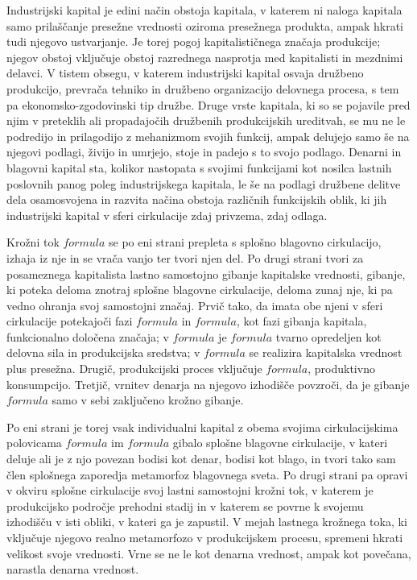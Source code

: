 \documentclass[kapital_02.tex]{subfiles}
\begin{document}
Industrijski kapital je edini način obstoja kapitala, v katerem ni naloga kapitala samo prilaščanje presežne vrednosti oziroma presežnega produkta, ampak hkrati tudi njegovo ustvarjanje. Je torej pogoj kapitalističnega značaja produkcije; njegov obstoj vključuje obstoj razrednega nasprotja med kapitalisti in mezdnimi delavci. V tistem obsegu, v katerem industrijski kapital osvaja družbeno produkcijo, prevrača tehniko in družbeno organizacijo delovnega procesa, s tem pa ekonomsko-zgodovinski tip družbe. Druge vrste kapitala, ki so se pojavile pred njim v preteklih ali propadajočih družbenih produkcijskih ureditvah, se mu ne le podredijo in prilagodijo z mehanizmom svojih funkcij, ampak delujejo samo še na njegovi podlagi, živijo in umrjejo, stoje in padejo s to svojo podlago. Denarni in blagovni kapital sta, kolikor nastopata s svojimi funkcijami kot nosilca lastnih poslovnih panog poleg industrijskega kapitala, le še na podlagi družbene delitve dela osamosvojena in razvita načina obstoja različnih funkcijskih oblik, ki jih industrijski kapital v sferi cirkulacije zdaj privzema, zdaj odlaga.

Krožni tok \( formula \) se po eni strani prepleta s splošno blagovno cirkulacijo, izhaja iz nje in se vrača vanjo ter tvori njen del. Po drugi strani tvori za posameznega kapitalista lastno samostojno gibanje kapitalske vrednosti, gibanje, ki poteka deloma znotraj splošne blagovne cirkulacije, deloma zunaj nje, ki pa vedno ohranja svoj samostojni značaj. Prvič tako, da imata obe njeni v sferi cirkulacije potekajoči fazi \( formula \) in \( formula \), kot fazi gibanja kapitala, funkcionalno določena značaja; v \( formula \) je \( formula \) tvarno opredeljen kot delovna sila in produkcijska sredstva; v \( formula \) se realizira kapitalska vrednost plus presežna. Drugič, produkcijski proces vključuje \( formula \), produktivno konsumpcijo. Tretjič, vrnitev denarja na njegovo izhodišče povzroči, da je gibanje \( formula \) samo v sebi zaključeno krožno gibanje.

Po eni strani je torej vsak individualni kapital z obema svojima cirkulacijskima polovicama \( formula \) im \( formula \) gibalo splošne blagovne cirkulacije, v kateri deluje ali je z njo povezan bodisi kot denar, bodisi kot blago, in tvori tako sam člen splošnega zaporedja metamorfoz blagovnega sveta. Po drugi strani pa opravi v okviru splošne cirkulacije svoj lastni samostojni krožni tok, v katerem je produkcijsko področje prehodni stadij in v katerem se povrne k svojemu izhodišču v isti obliki, v kateri ga je zapustil. V mejah lastnega krožnega toka, ki vključuje njegovo realno metamorfozo v produkcijskem procesu, spremeni hkrati velikost svoje vrednosti. Vrne se ne le kot denarna vrednost, ampak kot povečana, narastla denarna vrednost.
\end{document}
